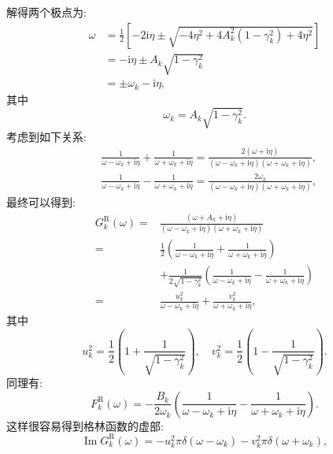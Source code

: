 解得两个极点为:
\begin{align}
\omega &=\frac{1}{2}\left[-2 \mathrm{i} \eta \pm \sqrt{-4 \eta^{2}+4 A_{k}^{2}\left(1-\gamma_{k}^{2}\right)+4 \eta^{2}}\right] \nonumber\\
&=-\mathrm{i} \eta \pm A_{k} \sqrt{1-\gamma_{k}^{2}} \nonumber\\
&=\pm \omega_{k}-\mathrm{i} \eta ,
\end{align}
其中
\begin{equation}
\omega_{k}=A_{k} \sqrt{1-\gamma_{k}^{2}}.
\end{equation}
考虑到如下关系:
\begin{align}
&\frac{1}{\omega-\omega_{k}+\mathrm{i} \eta}+\frac{1}{\omega+\omega_{k}+\mathrm{i} \eta}=\frac{2(\omega+\mathrm{i} \eta)}{\left(\omega-\omega_{k}+\mathrm{i} \eta\right)\left(\omega+\omega_{k}+\mathrm{i} \eta\right)},\nonumber \\
&\frac{1}{\omega-\omega_{k}+\mathrm{i} \eta}-\frac{1}{\omega+\omega_{k}+\mathrm{i} \eta}=\frac{2 \omega_{k}}{\left(\omega-\omega_{k}+\mathrm{i} \eta\right)\left(\omega+\omega_{k}+\mathrm{i} \eta\right)},
\end{align}
最终可以得到:
\begin{align}
G_{k}^\mathrm{R}(\omega)=& \frac{\left(\omega+A_{k}+\mathrm{i} \eta\right)}{\left(\omega-\omega_{k}+\mathrm{i} \eta\right)\left(\omega+\omega_{k}+\mathrm{i} \eta\right)} \nonumber\\
=& \frac{1}{2}\left(\frac{1}{\omega-\omega_{k}+\mathrm{i} \eta}+\frac{1}{\omega+\omega_{k}+\mathrm{i} \eta}\right) \nonumber\\
&+\frac{1}{2 \sqrt{1-\gamma_{k}^{2}}}\left(\frac{1}{\omega-\omega_{k}+\mathrm{i} \eta}-\frac{1}{\omega+\omega_{k}+\mathrm{i} \eta}\right) \nonumber\\
=& \frac{u_{k}^{2}}{\omega-\omega_{k}+\mathrm{i} \eta}+\frac{v_{k}^{2}}{\omega+\omega_{k}+\mathrm{i} \eta},
\end{align}
其中
\begin{equation}
u_{k}^{2}=\frac{1}{2}\left(1+\frac{1}{\sqrt{1-\gamma_{k}^{2}}}\right), \quad v_{k}^{2}=\frac{1}{2}\left(1-\frac{1}{\sqrt{1-\gamma_{k}^{2}}}\right).
\end{equation}
同理有:
\begin{equation}
F_{k}^\mathrm{R}(\omega)=-\frac{B_{k}}{2 \omega_{k}}\left(\frac{1}{\omega-\omega_{k}+\mathrm{i} \eta}-\frac{1}{\omega+\omega_{k}+\mathrm{i} \eta}\right) .
\end{equation}
这样很容易得到格林函数的虚部:
\begin{equation}
\operatorname{Im} G_{k}^\mathrm{R}(\omega)=-u_{k}^{2} \pi \delta\left(\omega-\omega_{k}\right)-v_{k}^{2} \pi \delta\left(\omega+\omega_{k}\right),
\end{equation}
